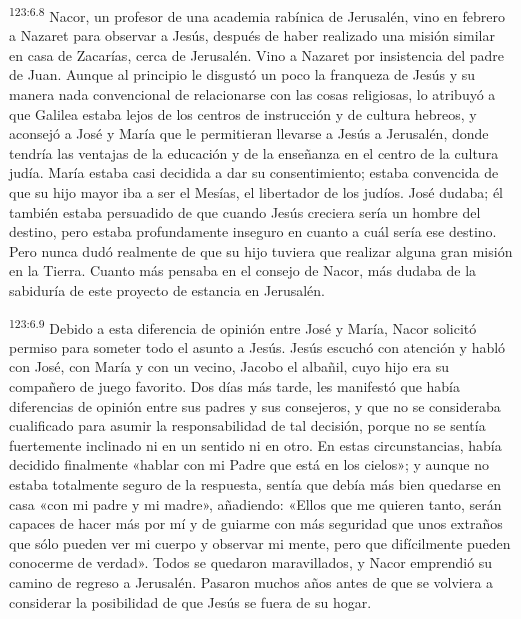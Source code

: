 \par 
\textsuperscript{123:6.8} Nacor, un profesor de una academia rabínica de Jerusalén, vino en febrero a Nazaret para observar a Jesús, después de haber realizado una misión similar en casa de Zacarías, cerca de Jerusalén. Vino a Nazaret por insistencia del padre de Juan. Aunque al principio le disgustó un poco la franqueza de Jesús y su manera nada convencional de relacionarse con las cosas religiosas, lo atribuyó a que Galilea estaba lejos de los centros de instrucción y de cultura hebreos, y aconsejó a José y María que le permitieran llevarse a Jesús a Jerusalén, donde tendría las ventajas de la educación y de la enseñanza en el centro de la cultura judía. María estaba casi decidida a dar su consentimiento; estaba convencida de que su hijo mayor iba a ser el Mesías, el libertador de los judíos. José dudaba; él también estaba persuadido de que cuando Jesús creciera sería un hombre del destino, pero estaba profundamente inseguro en cuanto a cuál sería ese destino. Pero nunca dudó realmente de que su hijo tuviera que realizar alguna gran misión en la Tierra. Cuanto más pensaba en el consejo de Nacor, más dudaba de la sabiduría de este proyecto de estancia en Jerusalén.

\par 
\textsuperscript{123:6.9} Debido a esta diferencia de opinión entre José y María, Nacor solicitó permiso para someter todo el asunto a Jesús. Jesús escuchó con atención y habló con José, con María y con un vecino, Jacobo el albañil, cuyo hijo era su compañero de juego favorito. Dos días más tarde, les manifestó que había diferencias de opinión entre sus padres y sus consejeros, y que no se consideraba cualificado para asumir la responsabilidad de tal decisión, porque no se sentía fuertemente inclinado ni en un sentido ni en otro. En estas circunstancias, había decidido finalmente «hablar con mi Padre que está en los cielos»; y aunque no estaba totalmente seguro de la respuesta, sentía que debía más bien quedarse en casa «con mi padre y mi madre», añadiendo: «Ellos que me quieren tanto, serán capaces de hacer más por mí y de guiarme con más seguridad que unos extraños que sólo pueden ver mi cuerpo y observar mi mente, pero que difícilmente pueden conocerme de verdad». Todos se quedaron maravillados, y Nacor emprendió su camino de regreso a Jerusalén. Pasaron muchos años antes de que se volviera a considerar la posibilidad de que Jesús se fuera de su hogar.